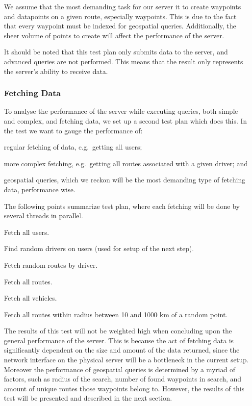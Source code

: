 We assume that the most demanding task for our server it to create waypoints and datapoints on a given route, especially waypoints.
This is due to the fact that every waypoint must be indexed for geospatial queries.
Additionally, the sheer volume of points to create will affect the performance of the server.

It should be noted that this test plan only submits data to the server, and advanced queries are not performed.
This means that the result only represents the server's ability to receive data.

\subsubsection*{Fetching Data}
To analyse the performance of the server while executing queries, both simple and complex, and fetching data, we set up a second test plan which does this.
In the test we want to gauge the performance of:
\begin{enumberate*}
    \item regular fetching of data, e.g.~getting all users;
    \item more complex fetching, e.g.~getting all routes associated with a given driver; and
    \item geospatial queries, which we reckon will be the most demanding type of fetching data, performance wise.
\end{enumberate*}

The following points summarize test plan, where each fetching will be done by several threads in parallel.
\begin{enumberate}
    \item Fetch all users.
    \item Find random drivers on users (used for setup of the next step).
    \item Fetch random routes by driver.
    \item Fetch all routes.
    \item Fetch all vehicles.
    \item Fetch all routes within radius between 10 and 1000 km of a random point.
\end{enumberate}

The results of this test will not be weighted high when concluding upon the general performance of the server.
This is because the act of fetching data is significantly dependent on the size and amount of the data returned, since the network interface on the physical server will be a bottleneck in the current setup.
Moreover the performance of geospatial queries is determined by a myriad of factors, such as radius of the search, number of found waypoints in search, and amount of unique routes those waypoints belong to.
However, the results of this test will be presented and described in the next section.
